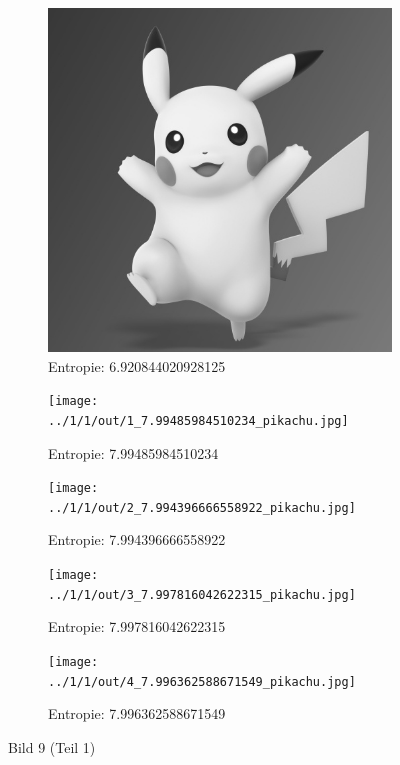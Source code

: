 \begin{figure}
	\centering

	\begin{subfigure}{0.25\textwidth}
		\includegraphics[width=\textwidth]{../1/3/gray_6.920844020928125_pikachu.jpg}
		\caption{Entropie: 6.920844020928125}
	\end{subfigure}

	\begin{subfigure}{0.25\textwidth}
		\texttt{[image: ../1/1/out/1\_7.99485984510234\_pikachu.jpg]}
		\caption{Entropie: 7.99485984510234}
	\end{subfigure}

	\begin{subfigure}{0.25\textwidth}
		\texttt{[image: ../1/1/out/2\_7.994396666558922\_pikachu.jpg]}
		\caption{Entropie: 7.994396666558922}
	\end{subfigure}

	\begin{subfigure}{0.25\textwidth}
		\texttt{[image: ../1/1/out/3\_7.997816042622315\_pikachu.jpg]}
		\caption{Entropie: 7.997816042622315}
	\end{subfigure}

	\begin{subfigure}{0.25\textwidth}
		\texttt{[image: ../1/1/out/4\_7.996362588671549\_pikachu.jpg]}
		\caption{Entropie: 7.996362588671549}
	\end{subfigure}
	\caption{Bild 9 (Teil 1)}
\end{figure}
